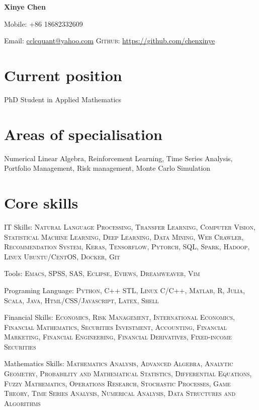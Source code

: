 \documentclass[11pt]{article}
\begin{document}
{\LARGE\bfseries Xinye Chen}
\bigskip\medskip

\medskip

Mobile: +86 18682332609
\medskip

Email: \href{mailto:cclcquant@yahoo.com}{cclcquant@yahoo.com}
\textsc{Github}: \href{https://github.com/chenxinye}{https://github.com/chenxinye}


\section*{Current position}
PhD Student in Applied Mathematics


\section*{Areas of specialisation}
Numerical Linear Algebra, Reinforcement Learning, Time Series Analysis, Portfolio Management, Risk management, Monte Carlo Simulation


\section*{Core skills}
IT Skills: \textsc{Natural Language Processing, Transfer Learning, Computer Vision, Statistical Machine Learning, Deep Learning, Data Mining, Web Crawler, Recommendation System, Keras, Tensorflow, Pytorch, SQL, Spark, Hadoop, Linux Ubuntu/CentOS, Docker, Git}

\vspace{0.01\textheight}

Tools: \textsc{Emacs, SPSS, SAS, Eclipse, Eviews, Dreamweaver, Vim}

\vspace{0.01\textheight}

Programing Language: \textsc{Python, C++ STL, Linux C/C++, Matlab, R, Julia, Scala, Java, Html/CSS/Javascript, Latex, Shell}

\vspace{0.01\textheight}

Financial Skills: \textsc{Economics, Risk Management, International Economics, Financial Mathematics, Securities Investment, Accounting, Financial Marketing, Financial Engineering, Financial Derivatives, Fixed-income Securities}

\vspace{0.01\textheight}

Mathematics Skills: \textsc{Mathematics Analysis, Advanced Algebra, Analytic Geometry, Probability and Mathematical Statistics, Differential Equations, Fuzzy Mathematics, Operations Research, Stochastic Processes, Game Theory, Time Series Analysis, Numerical Analysis, Data Structures and Algorithms}
\end{document}
